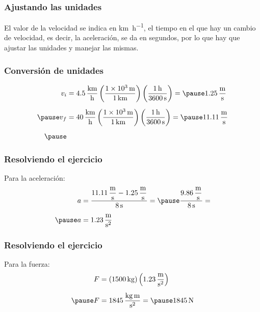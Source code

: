 \documentclass[14pt]{beamer}
\begin{document}
\begin{frame}
\frametitle{Ajustando las unidades}
El valor de la velocidad se indica en \si{\kilo\meter\per\hour}, el tiempo en el que hay un cambio de velocidad, es decir, la aceleración, se da en segundos, por lo que hay que ajustar las unidades y manejar las mismas.
\end{frame}
\begin{frame}
\frametitle{Conversión de unidades}
\begin{eqnarray*}
\begin{aligned}
v_{i} &= \SI[per-mode=fraction]{4.5}{\kilo\meter\per\hour} \left( \dfrac{\SI{1d3}{\meter}}{\SI{1}{\kilo\meter}} \right) \left( \dfrac{\SI{1}{\hour}}{\SI{3600}{\second}} \right) = \pause \SI[per-mode=fraction]{1.25}{\meter\per\second} \\[0.5em] \pause
v_{f} &= \SI[per-mode=fraction]{40}{\kilo\meter\per\hour} \left( \dfrac{\SI{1d3}{\meter}}{\SI{1}{\kilo\meter}} \right) \left( \dfrac{\SI{1}{\hour}}{\SI{3600}{\second}} \right) = \pause \SI[per-mode=fraction]{11.11}{\meter\per\second} \\[0.5em] \pause
\end{aligned}
\end{eqnarray*}
\end{frame}
\begin{frame}
\frametitle{Resolviendo el ejercicio}
 Para la aceleración:
\pause
\begin{eqnarray*}
\begin{aligned}
a &= \dfrac{ \displaystyle \SI[per-mode=fraction]{11.11}{\meter\per\second} - \SI[per-mode=fraction]{1.25}{\meter\per\second}}{\SI{8}{\second}} = \pause \dfrac{\displaystyle \SI[per-mode=fraction]{9.86}{\meter\per\second}}{\SI{8}{\second}} = \\[0.5em] \pause
a &= \SI[per-mode=fraction]{1.23}{\meter\per\square\second}
\end{aligned}
\end{eqnarray*}  
\end{frame}
\begin{frame}
\frametitle{Resolviendo el ejercicio}
 Para la fuerza:
\pause
\begin{eqnarray*}
\begin{aligned}
F &= \left( \SI{1500}{\kilo\gram} \right) \left( \SI[per-mode=fraction]{1.23}{\meter\per\square\second} \right) \\[0.5em] \pause
F &= \SI[per-mode=fraction]{1845}{\kilo\gram\meter\per\square\second} = \pause \SI{1845}{\newton}
\end{aligned}
\end{eqnarray*}  
\end{frame}
\end{document}
